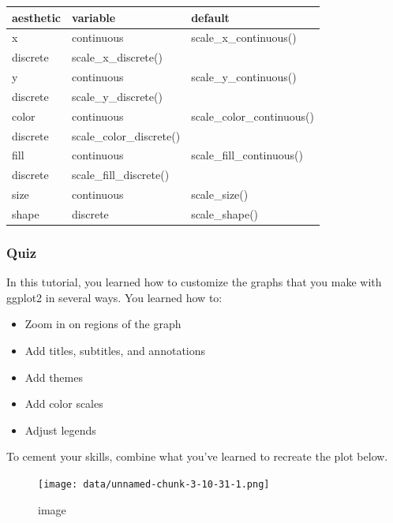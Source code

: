 \documentclass[
]{article}
\providecommand{\tightlist}{%
  \setlength{\itemsep}{0pt}\setlength{\parskip}{0pt}}
\begin{document}
\begin{longtable}[]{@{}lll@{}}
\toprule()
aesthetic & variable & default \\
\midrule()
\endhead
x & continuous & scale\_x\_continuous() \\
discrete & scale\_x\_discrete() & \\
y & continuous & scale\_y\_continuous() \\
discrete & scale\_y\_discrete() & \\
color & continuous & scale\_color\_continuous() \\
discrete & scale\_color\_discrete() & \\
fill & continuous & scale\_fill\_continuous() \\
discrete & scale\_fill\_discrete() & \\
size & continuous & scale\_size() \\
shape & discrete & scale\_shape() \\
\bottomrule()
\end{longtable}

\hypertarget{quiz-1}{%
\subsubsection{Quiz}\label{quiz-1}}

In this tutorial, you learned how to customize the graphs that you make
with ggplot2 in several ways. You learned how to:

\begin{itemize}
\tightlist
\item
  Zoom in on regions of the graph
\item
  Add titles, subtitles, and annotations
\item
  Add themes
\item
  Add color scales
\item
  Adjust legends
\end{itemize}

To cement your skills, combine what you've learned to recreate the plot
below.

\begin{figure}
\centering
\texttt{[image: data/unnamed-chunk-3-10-31-1.png]}
\caption{image}
\end{figure}
\end{document}
